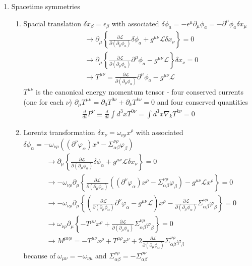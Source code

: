 \documentclass[10pt,a4paper]{report}
\theoremstyle{definition}
\begin{document}
\begin{enumerate}
\item Spacetime symmetries
\begin{enumerate}
\item Spacial translation $\delta x_\beta=\epsilon_\beta$ with associated $\delta\phi_a=-\epsilon^\mu\partial_\mu\phi_a=-\partial^\mu\phi_a\delta x_\mu$ 
\begin{align}
&\rightarrow
\partial_\mu\left\{\frac{\partial\mathcal{L}}{\partial(\partial_\mu\phi_a)}\delta\phi_a+g^{\mu\nu}\mathcal{L}\delta x_\nu\right\}=0\\
&\rightarrow
\partial_\mu\left\{\frac{\partial\mathcal{L}}{\partial(\partial_\mu\phi_a)}\partial^\mu\phi_a-g^{\mu\nu}\mathcal{L}\right\}\delta x_\nu=0\\
&\rightarrow
T^{\mu\nu}=\frac{\partial\mathcal{L}}{\partial(\partial_\mu\phi_a)}\partial^\mu\phi_a-g^{\mu\nu}\mathcal{L}
\end{align}
$T^{\mu\nu}$ is the canonical energy momentum tensor - four conserved currents (one for each $\nu$) $\partial_\mu T^{\mu\nu}=\partial_0T^{0\nu}+\partial_k T^{k\nu}=0$ and four conserved quantities
\begin{align}
\frac{d}{dt}P^\nu\equiv\frac{d}{dt}\int d^3xT^{0\nu}=\int d^3x \nabla_kT^{k\nu}=0
\end{align}

\item Lorentz transformation $\delta x_\nu=\omega_{\nu\rho}x^\rho$ with associated $\delta\phi_\alpha=-\omega_{\nu\rho}\left((\partial^\nu\varphi_\alpha)x^\rho-\Sigma^{\nu\rho}_{\alpha\beta}\varphi_\beta\right)$ 
\begin{align}
&\rightarrow
\partial_\mu\left\{\frac{\partial\mathcal{L}}{\partial(\partial_\mu\phi_\alpha)}\delta\phi_\alpha+g^{\mu\nu}\mathcal{L}\delta x_\nu\right\}=0\\
&\rightarrow
-\omega_{\nu\rho}\partial_\mu\left\{\frac{\partial\mathcal{L}}{\partial(\partial_\mu\phi_\alpha)}\left((\partial^\nu\varphi_\alpha)x^\rho-\Sigma^{\nu\rho}_{\alpha\beta}\varphi_\beta\right)-g^{\mu\nu}\mathcal{L}x^\rho\right\}=0\\
&\rightarrow
-\omega_{\nu\rho}\partial_\mu\left\{\left(\frac{\partial\mathcal{L}}{\partial(\partial_\mu\phi_\alpha)}\partial^\nu\varphi_\alpha-g^{\mu\nu}\mathcal{L}\right)x^\rho-\frac{\partial\mathcal{L}}{\partial(\partial_\mu\phi_\alpha)}\Sigma^{\nu\rho}_{\alpha\beta}\varphi_\beta\right\}=0\\
&\rightarrow
\omega_{\nu\rho}\partial_\mu\left\{-T^{\mu\nu}x^\rho+\frac{\partial\mathcal{L}}{\partial(\partial_\mu\phi_\alpha)}\Sigma^{\nu\rho}_{\alpha\beta}\varphi_\beta\right\}=0\\
&\rightarrow
M^{\mu\nu\rho}=-T^{\mu\nu}x^\rho+T^{\mu\rho}x^\nu+2\frac{\partial\mathcal{L}}{\partial(\partial_\mu\phi_\alpha)}\Sigma^{\nu\rho}_{\alpha\beta}\varphi_\beta
\end{align}
because of $\omega_{\mu\nu}=-\omega_{\nu\mu}$ and $\Sigma^{\nu\rho}_{\alpha\beta}=-\Sigma^{\rho\nu}_{\alpha\beta}$


\end{enumerate}
\end{enumerate}
\end{document}

